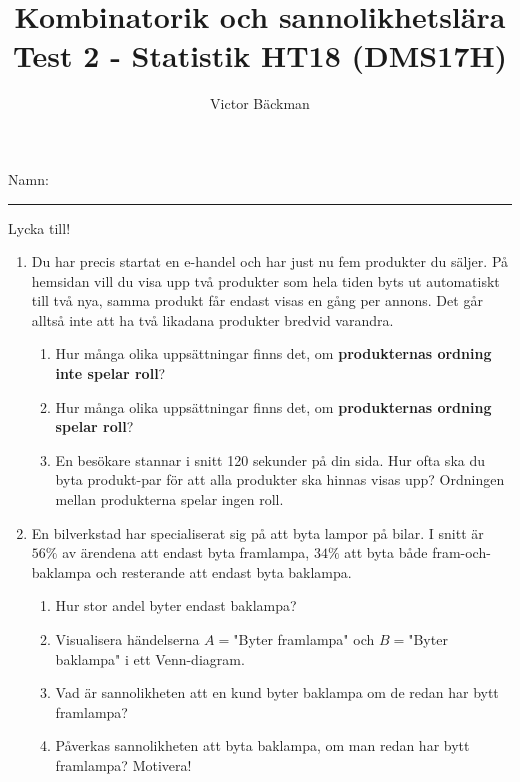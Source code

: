 \documentclass[a4paper,10pt]{article}
\title{Kombinatorik och sannolikhetslära \\ {\large Test 2 - Statistik HT18 (DMS17H)}}
\author{Victor Bäckman}
\begin{document}
\maketitle
\vspace{2cm}
Namn:
{\rule{13cm}{0.4pt}}
\vspace{8cm}
\begin{center}
  {\huge Lycka till!}
\end{center}
\newpage
\begin{enumerate}
  \item{Du har precis startat en e-handel och har just nu fem produkter du säljer. På hemsidan vill du visa upp   två produkter som hela tiden byts ut automatiskt till två nya, samma produkt får endast visas en gång per annons. Det går alltså inte att ha två likadana produkter bredvid varandra.}
    \begin{enumerate}
      \item{Hur många olika uppsättningar finns det, om {\bf produkternas ordning inte spelar roll}?}
      \vspace{6cm}
      \item{Hur många olika uppsättningar finns det, om {\bf produkternas ordning spelar roll}?}
      \vspace{6cm}
      \item{En besökare stannar i snitt 120 sekunder på din sida. Hur ofta ska du byta produkt-par för att alla produkter ska hinnas visas upp? Ordningen mellan produkterna spelar ingen roll.}
    \end{enumerate}
    \newpage
  \item{En bilverkstad har specialiserat sig på att byta lampor på bilar. I snitt är $56\%$ av ärendena att endast byta framlampa, $34\%$ att byta både fram-och-baklampa och resterande att endast byta baklampa.}
    \begin{enumerate}
        \item{Hur stor andel byter endast baklampa?}
        \vspace{2cm}
        \item{Visualisera händelserna $A=$"Byter framlampa" och $B=$"Byter baklampa" i ett Venn-diagram.}
        \vspace{5cm}
        \item{Vad är sannolikheten att en kund byter baklampa om de redan har bytt framlampa?}
        \vspace{5cm}
        \item{Påverkas sannolikheten att byta baklampa, om man redan har bytt framlampa? Motivera!}

\end{enumerate}
\end{enumerate}
\end{document}
